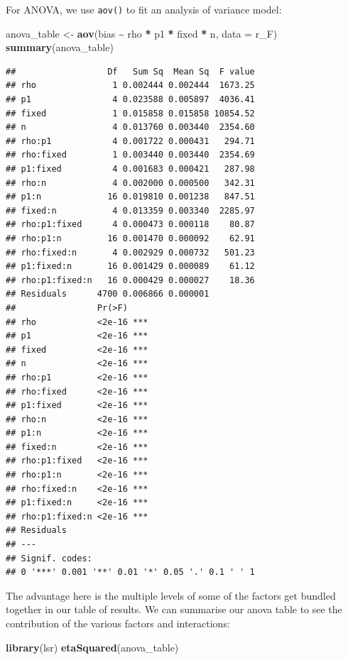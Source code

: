 \documentclass[
]{book}
\newenvironment{Shaded}{\begin{snugshade}}{\end{snugshade}}
\newcommand{\AttributeTok}[1]{\textcolor[rgb]{0.13,0.29,0.53}{#1}}
\newcommand{\FunctionTok}[1]{\textcolor[rgb]{0.13,0.29,0.53}{\textbf{#1}}}
\newcommand{\NormalTok}[1]{#1}
\newcommand{\OtherTok}[1]{\textcolor[rgb]{0.56,0.35,0.01}{#1}}
\newcommand{\SpecialCharTok}[1]{\textcolor[rgb]{0.81,0.36,0.00}{\textbf{#1}}}
\begin{document}
For ANOVA, we use \texttt{aov()} to fit an analysis of variance model:

\begin{Shaded}
\begin{Highlighting}[]
\NormalTok{anova\_table }\OtherTok{\textless{}{-}} \FunctionTok{aov}\NormalTok{(bias }\SpecialCharTok{\textasciitilde{}}\NormalTok{ rho }\SpecialCharTok{*}\NormalTok{ p1 }\SpecialCharTok{*}\NormalTok{ fixed }\SpecialCharTok{*}\NormalTok{ n, }\AttributeTok{data =}\NormalTok{ r\_F)}
\FunctionTok{summary}\NormalTok{(anova\_table)}
\end{Highlighting}
\end{Shaded}

\begin{verbatim}
##                  Df   Sum Sq  Mean Sq  F value
## rho               1 0.002444 0.002444  1673.25
## p1                4 0.023588 0.005897  4036.41
## fixed             1 0.015858 0.015858 10854.52
## n                 4 0.013760 0.003440  2354.60
## rho:p1            4 0.001722 0.000431   294.71
## rho:fixed         1 0.003440 0.003440  2354.69
## p1:fixed          4 0.001683 0.000421   287.98
## rho:n             4 0.002000 0.000500   342.31
## p1:n             16 0.019810 0.001238   847.51
## fixed:n           4 0.013359 0.003340  2285.97
## rho:p1:fixed      4 0.000473 0.000118    80.87
## rho:p1:n         16 0.001470 0.000092    62.91
## rho:fixed:n       4 0.002929 0.000732   501.23
## p1:fixed:n       16 0.001429 0.000089    61.12
## rho:p1:fixed:n   16 0.000429 0.000027    18.36
## Residuals      4700 0.006866 0.000001         
##                Pr(>F)    
## rho            <2e-16 ***
## p1             <2e-16 ***
## fixed          <2e-16 ***
## n              <2e-16 ***
## rho:p1         <2e-16 ***
## rho:fixed      <2e-16 ***
## p1:fixed       <2e-16 ***
## rho:n          <2e-16 ***
## p1:n           <2e-16 ***
## fixed:n        <2e-16 ***
## rho:p1:fixed   <2e-16 ***
## rho:p1:n       <2e-16 ***
## rho:fixed:n    <2e-16 ***
## p1:fixed:n     <2e-16 ***
## rho:p1:fixed:n <2e-16 ***
## Residuals                
## ---
## Signif. codes:  
## 0 '***' 0.001 '**' 0.01 '*' 0.05 '.' 0.1 ' ' 1
\end{verbatim}

The advantage here is the multiple levels of some of the factors get bundled together in our table of results.
We can summarise our anova table to see the contribution of the various factors and interactions:

\begin{Shaded}
\begin{Highlighting}[]
\FunctionTok{library}\NormalTok{(lsr)}
\FunctionTok{etaSquared}\NormalTok{(anova\_table)}
\end{Highlighting}
\end{Shaded}
\end{document}
